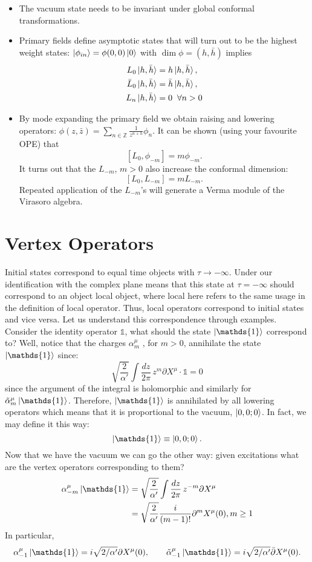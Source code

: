 \documentclass{report}
\theoremstyle{plain}
\theoremstyle{definition}
\theoremstyle{remark}
\newcommand{\FR}[2]{\frac{#1}{#2}}
\newcommand{\SFR}[2]{\sqrt{\frac{#1}{#2}}}
\newcommand{\di}{\partial}
\newcommand{\iden}{\mathds{1}}
\newcommand{\bZ}{\mathbb{Z}}
\begin{document}
\begin{itemize}
    \item The vacuum state needs to be invariant under global conformal
        transformations.  
    \item Primary fields define asymptotic states that will turn out to be
        the highest weight states: $\ket{\phi_{in}} = \phi(0,0)\ket 0$ with
        $\dim \phi = (h,\bar h)$ implies 
        \begin{align*}
            L_0\ket{h,\bar h} &= h \ket{h,\bar h},\\
            \bar L_0\ket{h,\bar h} &= \bar h \ket{h,\bar h},\\ 
            L_n\ket{h,\bar h} &= 0\;\;\forall n>0
        \end{align*}
    \item By mode expanding the primary field we obtain raising and
        lowering operators: $\phi(z,\bar z) = \sum_{n\in\bZ}
        \FR{1}{z^{n+h}} \phi_n$. It can be shown (using your favourite OPE)
        that \[ [L_0,\phi_{-m}] = m\phi_{-m}.\] It turns out that the
        $L_{-m}$, $m>0$ also increase the conformal dimension:
        \[ [L_0,L_{-m}]=mL_{-m}.\]
        Repeated application of the $L_{-m}$'s will generate a Verma module
        of the Virasoro algebra.
\end{itemize}


\section{Vertex Operators}
Initial states correspond to equal time objects with $\tau\to-\infty$.
Under our identification with the complex plane means that this state at
$\tau=-\infty$ should correspond to an object local object, where local
here refers to the same usage in the definition of local operator.
Thus, local operators correspond to initial states and vice versa. Let us
understand this correspondence through examples. Consider the identity
operator $\iden$, what should the state $\ket\iden$ correspond to?
Well, notice that the charges $\alpha^\mu_m$ , for $m>0$, annihilate the
state $\ket\iden$ since:
\[\SFR{2}{\alpha'}\int\FR{dz}{2\pi} \,z^m\di X^\mu\cdot \iden= 0\] 
since the argument of the integral is holomorphic and similarly for
$\tilde\alpha^\mu_m\ket{\iden}$. Therefore, $\ket\iden$ is annihilated by
all lowering operators which means that it is proportional to the vacuum,
$\ket{0,0;0}$. In fact, we may define it this way:
\[\ket{\iden} \equiv \ket{0,0;0}.\]
Now that we have the vacuum we can go the other way: given excitations what
are the vertex operators corresponding to them?
\begin{align*}
    \alpha^\mu_{-m}\ket\iden 
    &= \SFR{2}{\alpha'}\int \FR{dz}{2\pi} \, z^{-m}\di X^\mu\\
    &= \SFR{2}{\alpha'}\FR{i}{(m-1)!} \di^m X^\mu(0), m\ge 1
\end{align*}
In particular,
\[\alpha^\mu_{-1}\ket{\iden} = i\sqrt{2/\alpha'}\di X^\mu(0),\qquad
\tilde\alpha^\mu_{-1}\ket{\iden} = i\sqrt{2/\alpha'}\bar\di X^\mu(0).\]
\end{document}

